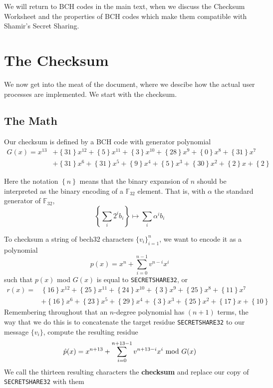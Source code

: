 \documentclass[letterpaper]{article}
\theoremstyle{xxx}
\theoremstyle{evil}
\theoremstyle{yyy}
\theoremstyle{plain}
\theoremstyle{zzz}
\newcommand{\fttwo}{\mathbb{F}_{32}}
\newcommand{\binrep}[1]{\left\{#1\right\}}
\newcommand{\vc}[1]{\texttt{#1}} %
\begin{document}
We will return to BCH codes in the main text, when we discuss the Checksum
Worksheet and the properties of BCH codes which make them compatible with
Shamir's Secret Sharing.

\section{The Checksum}

We now get into the meat of the document, where we descibe how the actual
user processes are implemented. We start with the checksum.

\subsection{The Math}
Our checksum is defined by a BCH code with generator polynomial
\begin{align*}
    G(x) = x^{13}
        &+ \binrep{31}x^{12} + \binrep{5}x^{11} + \binrep{3}x^{10} + \binrep{28}x^9 + \binrep{0}x^8 + \binrep{31}x^7\\
        &+ \binrep{31}x^6 + \binrep{31}x^5 + \binrep{9}x^4 + \binrep{5}x^3 + \binrep{30}x^2 + \binrep{2}x + \binrep{2}
\end{align*}

Here the notation $\binrep{n}$ means that the binary expansion of $n$ should be
interpreted as the binary encoding of a $\fttwo$ element. That is, with $\alpha$
the standard generator of $\fttwo$,
\[ \binrep{\sum_i 2^ib_i} \mapsto \sum_i \alpha^ib_i \]

To checksum a string of bech32 characters $\{v_i\}_{i=1}^n$, we want to encode it
as a polynomial
\[ p(x) = x^n + \sum_{i=0}^{n-1} v^{n-i} x^i \]
such that $p(x)$ mod $G(x)$ is equal to \vc{SECRETSHARE32}, or
\begin{align*}
r(x) =
    &\binrep{16}x^{12} + \binrep{25}x^{11} + \binrep{24}x^{10} + \binrep{3}x^9 + \binrep{25}x^8 + \binrep{11}x^7\\
    &+ \binrep{16}x^6 + \binrep{23}x^5 + \binrep{29}x^4 + \binrep{3}x^3 + \binrep{25}x^2 + \binrep{17}x + \binrep{10}
\end{align*}
Remembering throughout that an $n$-degree polynomial has $(n+1)$ terms, the way that
we do this is to concatenate the target residue \vc{SECRETSHARE32} to our message
$\{ v_i \}$, compute the resulting residue
\begin{equation}
 \hat{p}(x) = x^{n+13} + \sum_{i=0}^{n+13-1} v^{n+13-i} x^{i} \textnormal{ mod } G(x)
 \label{eq:modg}
\end{equation}
We call the thirteen resulting characters the \textbf{checksum} and replace our
copy of \vc{SECRETSHARE32} with them
\end{document}
